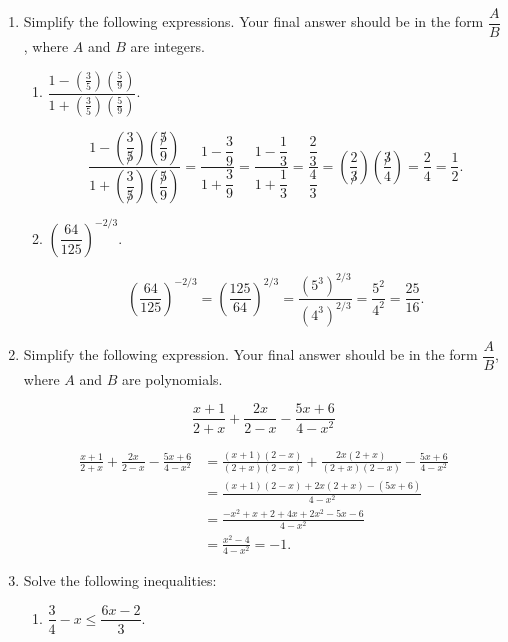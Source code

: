 \documentclass[12pt]{article}
\newcommand{\points}[1]{\marginpar{\hspace{24pt}[#1]}}
\newcommand{\di}{\displaystyle}
\begin{document}
\begin{enumerate}
\item Simplify the following expressions. Your final answer should be in the form $\dfrac{A}{B}$, where $A$ and $B$ are integers.
\begin{enumerate}
 \item $\dfrac{1-\left(\frac{3}{5}\right)\left(\frac{5}{9}\right)}{1+\left(\frac{3}{5}\right)\left(\frac{5}{9}\right)}$. \points{3}

\bigskip

\[
 \frac{1-\left(\dfrac{3}{\not 5}\right)\left(\dfrac{\not 5}{9}\right)}{1+\left(\dfrac{3}{\not 5}\right)\left(\dfrac{\not 5}{9}\right)} = \frac{1-\dfrac{3}{9}}{1+\dfrac{3}{9}} = \frac{1-\dfrac{1}{3}}{1+\dfrac{1}{3}} = \frac{\dfrac{2}{3}}{\dfrac{4}{3}}=\left(\frac{2}{\not 3}\right)\left(\frac{\not 3}{4}\right) = \frac{2}{4} = \frac{1}{2}.
\]

\bigskip

 \item $\left(\dfrac{64}{125}\right)^{-2/3}$. \points{3}

\bigskip

\[
 \left(\frac{64}{125}\right)^{-2/3} = \left(\frac{125}{64}\right)^{2/3} = \frac{(5^3)^{2/3}}{(4^3)^{2/3}} = \frac{5^2}{4^2} = \frac{25}{16}.
\]

\bigskip

\end{enumerate}
\item Simplify the following expression. Your final answer should be in the form $\dfrac{A}{B}$, where $A$ and $B$ are polynomials.\points{4} 

\[
\di \frac{x+1}{2+x}+\frac{2x}{2-x}-\frac{5x+6}{4-x^2} 
\]

\bigskip

\begin{align*}
 \frac{x+1}{2+x}+\frac{2x}{2-x}-\frac{5x+6}{4-x^2}&= \frac{(x+1)(2-x)}{(2+x)(2-x)}+\frac{2x(2+x)}{(2+x)(2-x)}-\frac{5x+6}{4-x^2}\\
& = \frac{(x+1)(2-x)+2x(2+x)-(5x+6)}{4-x^2}\\
& = \frac{-x^2+x+2+4x+2x^2-5x-6}{4-x^2}\\
& = \frac{x^2-4}{4-x^2} = -1.
\end{align*}

\newpage

\item Solve the following inequalities:
\begin{enumerate}
 \item $\dfrac{3}{4}-x \leq \dfrac{6x-2}{3}$. \points{3}


\end{enumerate}
\end{enumerate}
\end{document}
